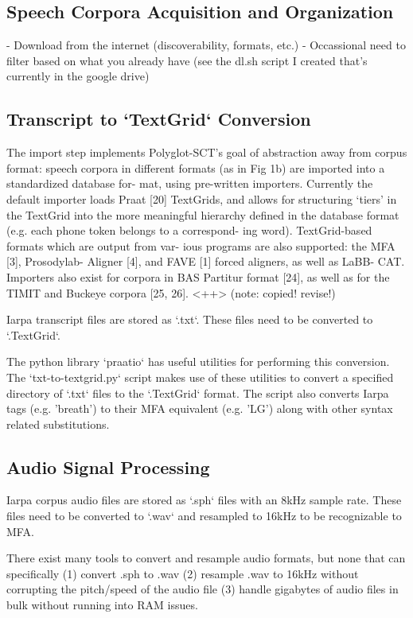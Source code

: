 \documentclass[twoside,11pt]{article}
\begin{document}
\subsection{Speech Corpora Acquisition and Organization}

- Download from the internet (discoverability, formats, etc.)
- Occassional need to filter based on what you already have (see the dl.sh script I created that's currently in the google drive)

\subsection{Transcript to `TextGrid` Conversion}

The import step implements Polyglot-SCT’s goal of abstraction
away from corpus format: speech corpora in different formats
(as in Fig 1b) are imported into a standardized database for-
mat, using pre-written importers. Currently the default importer
loads Praat [20] TextGrids, and allows for structuring ‘tiers’ in
the TextGrid into the more meaningful hierarchy defined in the
database format (e.g. each phone token belongs to a correspond-
ing word). TextGrid-based formats which are output from var-
ious programs are also supported: the MFA [3], Prosodylab-
Aligner [4], and FAVE [1] forced aligners, as well as LaBB-
CAT. Importers also exist for corpora in BAS Partitur format
[24], as well as for the TIMIT and Buckeye corpora [25, 26].
<++> (note: copied! revise!)

Iarpa transcript files are stored as `.txt`. These files need to be converted to `.TextGrid`.

The python library `praatio` has useful utilities for performing this conversion. The `txt-to-textgrid.py` script makes use of these utilities to convert a specified directory of `.txt` files to the `.TextGrid` format. The script also converts Iarpa tags (e.g. '\<breath\>') to their MFA equivalent (e.g. '{LG}') along with other syntax related substitutions.


\subsection{Audio Signal Processing}

Iarpa corpus audio files are stored as `.sph` files with an 8kHz sample rate. These files need to be converted to `.wav` and resampled to 16kHz to be recognizable to MFA.

There exist many tools to convert and resample audio formats, but none that can specifically (1) convert .sph to .wav (2) resample .wav to 16kHz without corrupting the pitch/speed of the audio file (3) handle gigabytes of audio files in bulk without running into RAM issues.
\end{document}
